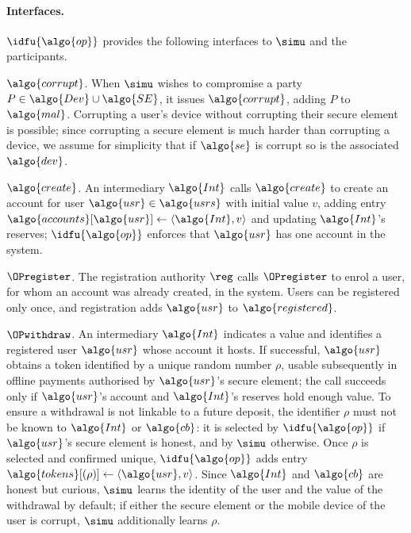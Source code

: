 \paragraph{Interfaces.} $\idfu{\algo{op}}$ provides the following interfaces to $\simu$
and the participants.

\underline{$\algo{corrupt}$}. When $\simu$ wishes to compromise a party $P \in
\algo{Dev} \cup \algo{SE}$, it issues $\algo{corrupt}$, adding $P$ to
$\algo{mal}$. Corrupting a user's device without corrupting their secure
element is possible; since corrupting a secure element is much harder than
corrupting a device, we assume for simplicity that if $\algo{se}$ is corrupt so
is the associated $\algo{dev}$.

\underline{$\algo{create}$}. An intermediary $\algo{Int}$ calls $\algo{create}$
to create an account for user $\algo{usr} \in \algo{usrs}$ with initial value
$v$, adding entry $\algo{accounts}[\algo{usr}] \gets \langle \algo{Int}, v
\rangle$ and updating $\algo{Int}$'s reserves; $\idfu{\algo{op}}$ enforces that
$\algo{usr}$ has one account in the system.

\underline{$\OPregister$}. The registration authority $\reg$ calls
$\OPregister$ to enrol a user, for whom an account was already created, in
the system. Users can be registered only once, and registration adds
$\algo{usr}$ to $\algo{registered}$.

\underline{$\OPwithdraw$}. An intermediary $\algo{Int}$ indicates a value
and identifies a registered user $\algo{usr}$ whose account it hosts. If
successful, $\algo{usr}$ obtains a token identified by a unique random number
$\rho$, usable subsequently in offline payments authorised by $\algo{usr}$'s
secure element; the call succeeds only if $\algo{usr}$'s account and
$\algo{Int}$'s reserves hold enough value. To ensure a withdrawal is not
linkable to a future deposit, the identifier $\rho$ must not be known to
$\algo{Int}$ or $\algo{cb}$: it is selected by $\idfu{\algo{op}}$ if $\algo{usr}$'s
secure element is honest, and by $\simu$ otherwise. Once $\rho$ is selected and
confirmed unique, $\idfu{\algo{op}}$ adds entry $\algo{tokens}[(\rho)] \gets \langle
\algo{usr}, v \rangle$. Since $\algo{Int}$ and $\algo{cb}$ are honest but
curious, $\simu$ learns the identity of the user and the value of the
withdrawal by default; if either the secure element or the mobile device of the
user is corrupt, $\simu$ additionally learns $\rho$.

